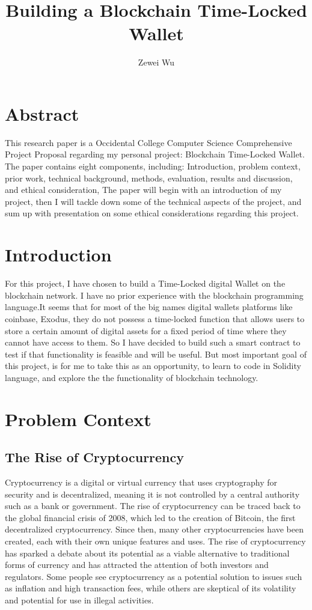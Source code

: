 \documentclass[10pt,twocolumn]{article}
\title{Building a Blockchain Time-Locked Wallet}
\author{Zewei Wu}
\affiliation{Occidental College}
\begin{document}
\maketitle

\section{Abstract}
This research paper is a Occidental College Computer Science Comprehensive Project Proposal regarding my personal project: Blockchain Time-Locked Wallet. The paper contains eight components, including: Introduction, problem context, prior work, technical background, methods, evaluation, results and discussion, and ethical consideration,  The paper will begin with an introduction of my project, then I will tackle down some of the technical aspects of the project, and sum up with presentation on some ethical considerations regarding this project.

\section{Introduction}

For this project, I have chosen to build a Time-Locked digital Wallet on the blockchain network. I have no prior experience with the blockchain programming language.It seems that for most of the big names digital wallets platforms like coinbase, Exodus, they do not possess a time-locked function that allows users to store a certain amount of digital assets for a fixed period of time where they cannot have access to them. So I have decided to build such a smart contract to test if that functionality is feasible and will be useful. But most important goal of this project, is for me to take this as an opportunity, to learn to code in Solidity language, and explore the the functionality of blockchain technology.



\section{Problem Context}
	
\subsection{The Rise of Cryptocurrency}
Cryptocurrency is a digital or virtual currency that uses cryptography for security and is decentralized, meaning it is not controlled by a central authority such as a bank or government. The rise of cryptocurrency can be traced back to the global financial crisis of 2008, which led to the creation of Bitcoin, the first decentralized cryptocurrency. Since then, many other cryptocurrencies have been created, each with their own unique features and uses. The rise of cryptocurrency has sparked a debate about its potential as a viable alternative to traditional forms of currency and has attracted the attention of both investors and regulators. Some people see cryptocurrency as a potential solution to issues such as inflation and high transaction fees, while others are skeptical of its volatility and potential for use in illegal activities.
\end{document}
